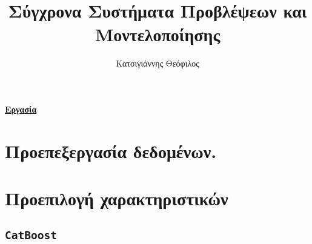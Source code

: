 \documentclass[a4paper,12pt]{article}
\title{Σύγχρονα Συστήματα Προβλέψεων και Μοντελοποίησης}
\author{Κατσιγιάννης Θεόφιλος}
\newcommand{\code}[1]{\textlatin{\texttt{#1}}}
\begin{document}
\maketitle
\begin{center}
\textbf{\underline{\large{Εργασία}}}
\end{center}
\section{Προεπεξεργασία δεδομένων.}
\section{Προεπιλογή χαρακτηριστικών}
\subsection{\code{CatBoost}}
\end{document}
